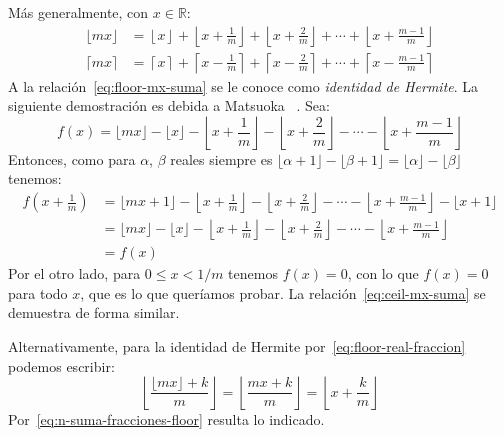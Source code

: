   Más generalmente,
  con \(x \in \mathbb{R}\):
  \begin{align}
    \label{eq:floor-mx-suma}
    \lfloor m x \rfloor
      &= \left\lfloor x \right\rfloor
	   + \left\lfloor x + \frac{1}{m} \right\rfloor
	   + \left\lfloor x + \frac{2}{m} \right\rfloor
	   + \dotsb
	   + \left\lfloor x + \frac{m - 1}{m} \right\rfloor \\
    \label{eq:ceil-mx-suma}
    \lceil m x \rceil
      &= \left\lceil x \right\rceil
	   + \left\lceil x - \frac{1}{m} \right\rceil
	   + \left\lceil x - \frac{2}{m} \right\rceil
	   + \dotsb
	   + \left\lceil x - \frac{m - 1}{m} \right\rceil
  \end{align}
  A la relación~\eqref{eq:floor-mx-suma}
  se le conoce como \emph{identidad de Hermite}.%
  La siguiente demostración es debida a Matsuoka~%
    \cite{matsuoka64:_Hermite_identity}.
  Sea:
  \begin{equation*}
    f(x)
      = \lfloor m x \rfloor
	  - \lfloor x \rfloor
	  - \left\lfloor x + \frac{1}{m} \right\rfloor
	  - \left\lfloor x + \frac{2}{m} \right\rfloor
	  - \dotsb
	  - \left\lfloor x + \frac{m - 1}{m} \right\rfloor
  \end{equation*}
  Entonces,
  como para \(\alpha\), \(\beta\) reales siempre es
  \(\lfloor \alpha + 1 \rfloor - \lfloor \beta + 1 \rfloor
      = \lfloor \alpha \rfloor - \lfloor \beta \rfloor\)
  tenemos:
  \begin{align*}
    f\left( x + \frac{1}{m} \right)
      &= \lfloor m x + 1 \rfloor
	   - \left\lfloor x + \frac{1}{m}\right\rfloor
	   - \left\lfloor x + \frac{2}{m} \right\rfloor
	   - \dotsb
	   - \left\lfloor x + \frac{m - 1}{m} \right\rfloor
	   - \lfloor x + 1 \rfloor \\
      &= \lfloor m x \rfloor
	   - \lfloor x \rfloor
	   - \left\lfloor x + \frac{1}{m} \right\rfloor
	   - \left\lfloor x + \frac{2}{m} \right\rfloor
	   - \dotsb
	   - \left\lfloor x + \frac{m - 1}{m} \right\rfloor \\
      &= f(x)
  \end{align*}
  Por el otro lado,
  para \(0 \le x < 1 / m\) tenemos \(f(x) = 0\),
  con lo que \(f(x) = 0\) para todo \(x\),
  que es lo que queríamos probar.
  La relación~\eqref{eq:ceil-mx-suma} se demuestra de forma similar.

  Alternativamente,
  para la identidad de Hermite
  por~\eqref{eq:floor-real-fraccion} podemos escribir:
  \begin{equation*}
    \left\lfloor \frac{\lfloor m x \rfloor + k}{m} \right\rfloor
      = \left\lfloor \frac{m x + k}{m} \right\rfloor
      = \left\lfloor x + \frac{k}{m} \right\rfloor
  \end{equation*}
  Por~\eqref{eq:n-suma-fracciones-floor} resulta lo indicado.


